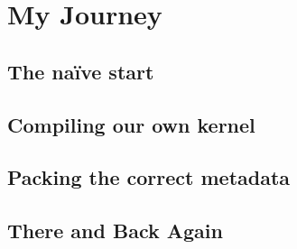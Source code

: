 \section{My Journey}

\subsection{The naïve start}

\subsection{Compiling our own kernel}

\subsection{Packing the correct metadata}

\subsection{There and Back Again}
